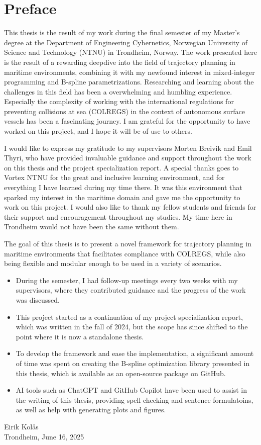 
\section*{Preface}
\vspace{0.5cm}

This thesis is the result of my work during the final semester of my Master's degree at the Department of Engineering Cybernetics, Norwegian University of Science and Technology (NTNU) in Trondheim, Norway. The work presented here is the result of a rewarding deepdive into the field of trajectory planning in maritime environments, combining it with my newfound interest in mixed-integer programming and B-spline parametrizations. 
Researching and learning about the challenges in this field has been a overwhelming and humbling experience. Especially the complexity of working with the international regulations for preventing collisions at sea (COLREGS) in the context of autonomous surface vessels has been a fascinating journey.
I am grateful for the opportunity to have worked on this project, and I hope it will be of use to others.

I would like to express my gratitude to my supervisors Morten Breivik and Emil Thyri, who have provided invaluable guidance and support throughout the work on this thesis and the project specialization report. A special thanks goes to Vortex NTNU for the great and inclusive learning environment, and for everything I have learned during my time there. It was this environment that sparked my interest in the maritime domain and gave me the opportunity to work on this project. I would also like to thank my fellow students and friends for their support and encouragement throughout my studies. My time here in Trondheim would not have been the same without them. 

The goal of this thesis is to present a novel framework for trajectory planning in maritime environments that facilitates compliance with COLREGS, while also being flexible and modular enough to be used in a variety of scenarios. 
\begin{itemize}
    \item During the semester, I had follow-up meetings every two weeks with my supervisors, where they contributed guidance and the progress of the work was discussed.
    \item This project started as a continuation of my project specialization report, which was written in the fall of 2024, but the scope has since shifted to the point where it is now a standalone thesis. 
    \item To develop the framework and ease the implementation, a significant amount of time was spent on creating the B-spline optimization library presented in this thesis, which is available as an open-source package on GitHub. 
    \item AI tools such as ChatGPT and GitHub Copilot have been used to assist in the writing of this thesis, providing spell checking and sentence formulatoins, as well as help with generating plots and figures.
\end{itemize}    


\begin{center}
    \vspace{1cm}
    Eirik Kolås\\
    Trondheim, June 16, 2025
\end{center}


\cleardoublepage